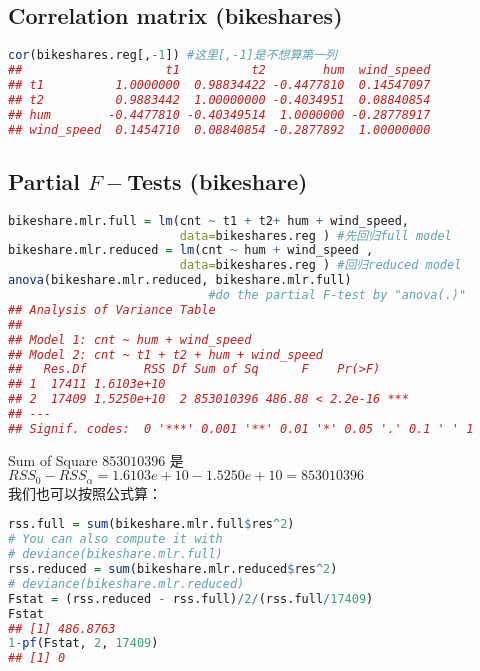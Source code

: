 \documentclass[11pt,a4paper]{article}
\begin{document}
\subsection{Correlation matrix (bikeshares)}
\begin{lstlisting}[language=R]
cor(bikeshares.reg[,-1]) #这里[,-1]是不想算第一列
##                    t1          t2        hum  wind_speed
## t1          1.0000000  0.98834422 -0.4477810  0.14547097
## t2          0.9883442  1.00000000 -0.4034951  0.08840854
## hum        -0.4477810 -0.40349514  1.0000000 -0.28778917
## wind_speed  0.1454710  0.08840854 -0.2877892  1.00000000
\end{lstlisting}

\subsection{Partial $F-$Tests (bikeshare)}
\begin{lstlisting}[language=R]
bikeshare.mlr.full = lm(cnt ~ t1 + t2+ hum + wind_speed,
                        data=bikeshares.reg ) #先回归full model
bikeshare.mlr.reduced = lm(cnt ~ hum + wind_speed ,
                        data=bikeshares.reg ) #回归reduced model
anova(bikeshare.mlr.reduced, bikeshare.mlr.full)
                            #do the partial F-test by "anova(.)"
## Analysis of Variance Table
## 
## Model 1: cnt ~ hum + wind_speed
## Model 2: cnt ~ t1 + t2 + hum + wind_speed
##   Res.Df        RSS Df Sum of Sq      F    Pr(>F)
## 1  17411 1.6103e+10
## 2  17409 1.5250e+10  2 853010396 486.88 < 2.2e-16 ***
## ---
## Signif. codes:  0 '***' 0.001 '**' 0.01 '*' 0.05 '.' 0.1 ' ' 1
\end{lstlisting}
Sum of Square $853010396$ 是 $RSS_0-RSS_\alpha=1.6103e+10-1.5250e+10=853010396$\\
我们也可以按照公式算：
\begin{lstlisting}[language=R]
rss.full = sum(bikeshare.mlr.full$res^2)
# You can also compute it with
# deviance(bikeshare.mlr.full)
rss.reduced = sum(bikeshare.mlr.reduced$res^2)
# deviance(bikeshare.mlr.reduced)
Fstat = (rss.reduced - rss.full)/2/(rss.full/17409)
Fstat
## [1] 486.8763
1-pf(Fstat, 2, 17409)
## [1] 0
\end{lstlisting}
\end{document}
